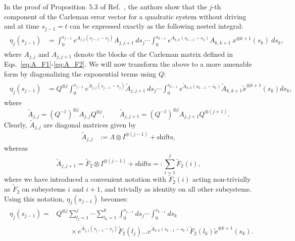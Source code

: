 \documentclass[superscriptaddress,onecolumn,nofootinbib,longbibliography,a4paper,accepted=2026-09-29]{quantumarticle}
\theoremstyle{plain}
\theoremstyle{definition}
\numberwithin{thm}{section}
\numberwithin{assumption}{section}
\numberwithin{lemma}{section}
\numberwithin{prop}{section}
\numberwithin{cor}{section}
\numberwithin{definition}{section}
\numberwithin{rmk}{section}
\numberwithin{equation}{section}
\newcommand{\ot}{\otimes}
\begin{document}
In the proof of Proposition~5.3 of Ref.~\cite{forets2017explicit}, the authors show that the $j$-th component of the Carleman error vector for a quadratic system without driving and at time $s_{j-1}=t$ can be expressed exactly as the following nested integral:
\begin{align}
\begin{split}
     \label{eq:nested_int}
     \eta_j(s_{j-1}) &=  \int_{0}^{s_{j-1}}  e^{A_{j,j}(s_{j-1}-s_{j})} A_{j,j+1}  \ ds_j \cdots \int_{0}^{s_{k-1}} e^{A_{k,k}(s_{k-1}-s_k)} A_{k,k+1} \ x^{\otimes k+1}(s_k) \  ds_k,
\end{split}
\end{align}
where $A_{j,j}$ and $A_{j,j+1}$ denote the blocks of the Carleman matrix defined in Eqs.~\eqref{eq:A_F1}-\eqref{eq:A_F2}. We will now transform the above to a more amenable form by diagonalizing the exponential terms using $Q$:
\begin{align}
\begin{split}
    \label{eq:nested_int_diag}
    \eta_j(s_{j-1}) &=  Q^{\ot j} \int_{0}^{s_{j-1}}  e^{\tilde{A}_{j,j}(s_{j-1}-s_{j})} \tilde{A}_{j,j+1} \ ds_j \cdots   \int_{0}^{s_{k-1}} e^{\tilde{A}_{k,k}(s_{k-1}-s_k)} \tilde{A}_{k,k+1} \tilde{x}^{\otimes k+1}(s_k) ds_k,
\end{split}
\end{align}
where
\begin{equation}
    \tilde{A}_{j,j}= (Q^{-1})^{\otimes j} A_{j,j} Q^{\otimes j},\qquad \tilde{A}_{j,j+1} = (Q^{-1})^{\otimes j} A_{j,j+1} Q^{\otimes (j+1)}.
\end{equation}
Clearly, $\tilde{A}_{j,j}$ are diagonal matrices given by
\begin{align}
    \tilde{A}_{j,j}  &:= \Lambda \otimes I^{\otimes (j-1)}  + \mbox{shifts},
\end{align}
whereas
\begin{equation}
    \tilde{A}_{j,j+1} = \tilde{F}_2\otimes I^{\otimes (j-1)}+ \mbox{shifts} =: \sum_{i=1}^j \tilde{F}_2(i),
\end{equation}
where we have introduced a convenient notation with $\tilde{F}_2(i)$ acting non-trivially as $\tilde{F}_2$ on subsystems $i$ and $i+1$, and trivially as identity on all other subsystems. Using this notation, $\eta_j(s_{j-1})$ becomes:
\begin{align}
\begin{split}
    \label{eq:nested_int_F2}
    \eta_j(s_{j-1}) = &  Q^{\ot j} \sum_{l_j=1}^{j} \cdots \sum_{l_k=1}^k \int_{0}^{s_{j-1}} ds_{j} \cdots \int_{0}^{s_{k-1}} ds_k \\
    &\qquad  \times e^{\tilde{A}_{j,j}(s_{j-1}-s_{j})}  \tilde{F}_2(l_j) \dots e^{\tilde{A}_{k,k}(s_{k-1}-s_k)} \tilde{F}_2(l_k) \tilde{x}^{\otimes k+1}(s_k).
\end{split}
\end{align}
\end{document}
